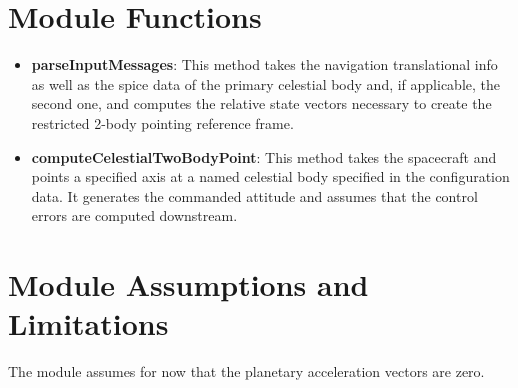 

\section{Module Functions}
\begin{itemize}
	\item \textbf{parseInputMessages}: This method takes the navigation translational info as well as the spice data of the primary celestial body and, if applicable, the second one, and computes the relative state vectors necessary to create the restricted 2-body pointing reference frame.
	\item \textbf{computeCelestialTwoBodyPoint}: This method takes the spacecraft and points a specified axis at a named
 celestial body specified in the configuration data.  It generates the commanded attitude and assumes that the control errors are computed downstream.	
 \end{itemize}

\section{Module Assumptions and Limitations}
The module assumes for now that the planetary acceleration vectors are zero.
